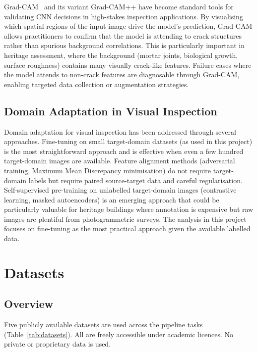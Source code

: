\documentclass[12pt,a4paper]{article}
\begin{document}
Grad-CAM~\cite{selvaraju2020gradcam} and its variant Grad-CAM++ have become standard tools for validating CNN decisions in high-stakes inspection applications. By visualising which spatial regions of the input image drive the model's prediction, Grad-CAM allows practitioners to confirm that the model is attending to crack structures rather than spurious background correlations. This is particularly important in heritage assessment, where the background (mortar joints, biological growth, surface roughness) contains many visually crack-like features. Failure cases where the model attends to non-crack features are diagnosable through Grad-CAM, enabling targeted data collection or augmentation strategies.

\subsection{Domain Adaptation in Visual Inspection}

Domain adaptation for visual inspection has been addressed through several approaches. Fine-tuning on small target-domain datasets (as used in this project) is the most straightforward approach and is effective when even a few hundred target-domain images are available. Feature alignment methods (adversarial training, Maximum Mean Discrepancy minimisation) do not require target-domain labels but require paired source-target data and careful regularisation. Self-supervised pre-training on unlabelled target-domain images (contrastive learning, masked autoencoders) is an emerging approach that could be particularly valuable for heritage buildings where annotation is expensive but raw images are plentiful from photogrammetric surveys. The analysis in this project focuses on fine-tuning as the most practical approach given the available labelled data.

\clearpage
\section{Datasets}

\subsection{Overview}

Five publicly available datasets are used across the pipeline tasks (Table~\ref{tab:datasets}). All are freely accessible under academic licences. No private or proprietary data is used.
\end{document}
